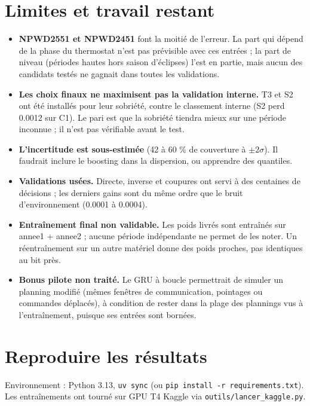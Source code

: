 \documentclass[11pt,a4paper]{article}
\newcommand{\code}[1]{\texttt{#1}}
\begin{document}
\section{Limites et travail restant}

\begin{itemize}
  \item \textbf{NPWD2551 et NPWD2451} font la moitié de l'erreur. La part qui dépend de la phase du thermostat n'est pas prévisible avec ces entrées ; la part de niveau (périodes hautes hors saison d'éclipses) l'est en partie, mais aucun des candidats testés ne gagnait dans toutes les validations.
  \item \textbf{Les choix finaux ne maximisent pas la validation interne.} T3 et S2 ont été installés pour leur sobriété, contre le classement interne (S2 perd 0.0012 sur C1). Le pari est que la sobriété tiendra mieux sur une période inconnue ; il n'est pas vérifiable avant le test.
  \item \textbf{L'incertitude est sous-estimée} (42 à 60 \% de couverture à $\pm 2\sigma$). Il faudrait inclure le boosting dans la dispersion, ou apprendre des quantiles.
  \item \textbf{Validations usées.} Directe, inverse et coupures ont servi à des centaines de décisions ; les derniers gains sont du même ordre que le bruit d'environnement (0.0001 à 0.0004).
  \item \textbf{Entraînement final non validable.} Les poids livrés sont entraînés sur annee1 + annee2 ; aucune période indépendante ne permet de les noter. Un réentraînement sur un autre matériel donne des poids proches, pas identiques au bit près.
  \item \textbf{Bonus pilote non traité.} Le GRU à boucle permettrait de simuler un planning modifié (mêmes fenêtres de communication, pointages ou commandes déplacés), à condition de rester dans la plage des plannings vus à l'entraînement, puisque ses entrées sont bornées.
\end{itemize}

\appendix
\section{Reproduire les résultats}

Environnement : Python 3.13, \code{uv sync} (ou \code{pip install -r requirements.txt}). Les entraînements ont tourné sur GPU T4 Kaggle via \code{outils/lancer\_kaggle.py}.
\end{document}
